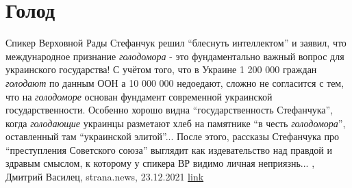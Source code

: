  
 
 
 
 
\chapter{Голод}

Спикер Верховной Рады Стефанчук решил \enquote{блеснуть интеллектом} и заявил, что
международное признание \emph{голодомора} - это фундаментально важный вопрос для
украинского государства!  С учётом того, что в Украине 1 200 000 граждан
\emph{голодают} по данным ООН а 10 000 000 недоедают, сложно не согласится с тем, что
на \emph{голодоморе} основан фундамент современной украинской государственности.
Особенно хорошо видна \enquote{государственность Стефанчука}, когда \emph{голодающие} украинцы
разметают хлеб на памятнике \enquote{в честь \emph{голодомора}}, оставленный там \enquote{украинской
элитой}...  После этого, рассказы Стефанчука про \enquote{преступления Советского
союза} выглядит как издевательство над правдой и здравым смыслом, к которому у
спикера ВР видимо личная неприязнь...
, 
Дмитрий Василец, strana.news, 23.12.2021
\href{https://strana.news/opinions/368485-holodomor-i-pravda-fundamentalnaja-problema-sovremennoj-ukrainy.html}{link}
